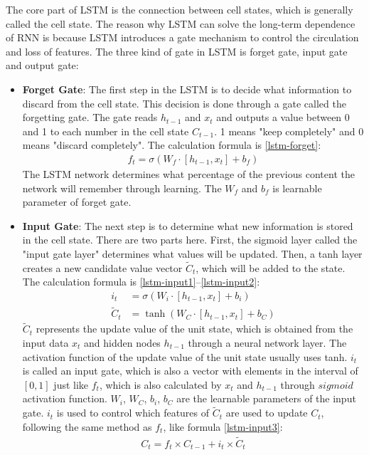 The core part of LSTM is the connection between cell states, which is generally called the cell state. The reason why LSTM can solve the long-term dependence of RNN is because LSTM introduces a gate mechanism to control the circulation and loss of features. The three kind of gate in LSTM is forget gate, input gate and output gate:
\begin{itemize}
	\item \textbf{Forget Gate}: The first step in the LSTM is to decide what information to discard from the cell state. This decision is done through a gate called the forgetting gate. The gate reads $h_{t-1}$ and $x_t$ and outputs a value between 0 and 1 to each number in the cell state $C_{t-1}$. 1 means "keep completely" and 0 means "discard completely". The calculation formula is \ref{lstm-forget}:
	      \begin{align}
		      f_{t}=\sigma\left(W_{f} \cdot\left[h_{t-1}, x_{t}\right]+b_{f}\right) \label{lstm-forget}
	      \end{align}
	      The LSTM network determines what percentage of the previous content the network will remember through learning. The $W_f$ and $b_f$ is learnable parameter of forget gate.
	\item \textbf{Input Gate}: The next step is to determine what new information is stored in the cell state. There are two parts here. First, the sigmoid layer called the "input gate layer" determines what values will be updated. Then, a tanh layer creates a new candidate value vector $\widetilde{C}_t$, which will be added to the state. The calculation formula is \ref{lstm-input1}--\ref{lstm-input2}:
	      \begin{align}
		      i_{t}         & =\sigma\left(W_{i} \cdot\left[h_{t-1}, x_{t}\right]+b_{i}\right) \label{lstm-input1} \\
		      \tilde{C}_{t} & =\tanh \left(W_{C} \cdot\left[h_{t-1}, x_{t}\right]+b_{C}\right) \label{lstm-input2}
	      \end{align}
	      $\tilde{C}_{t}$ represents the update value of the unit state, which is obtained from the input data $x_t$ and hidden nodes $h_{t-1}$ through a neural network layer. The activation function of the update value of the unit state usually uses tanh. $i_t$ is called an input gate, which is also a vector with elements in the interval of $[0,1]$ just like $f_t$, which is also calculated by $x_t$ and $h_{t-1}$ through $sigmoid$ activation function. $W_i$, $W_C$, $b_i$, $b_C$ are the learnable parameters of the input gate. $i_t$ is used to control which features of $\tilde{C}_{t}$ are used to update $C_t$, following the same method as $f_t$, like formula \ref{lstm-input3}:
	      \begin{align}
		      C_{t}=f_{t} \times C_{t-1}+i_{t} \times \tilde{C}_{t} \label{lstm-input3}
	      \end{align}


\end{itemize}
